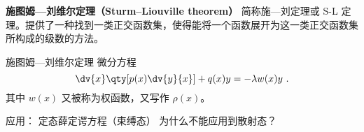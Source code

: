 
\begin{issues}
\issueDraft
\end{issues}


\textbf{施图姆—刘维尔定理（Sturm–Liouville theorem）} 简称施—刘定理或 S-L 定理。提供了一种找到一类正交函数集，使得能将一个函数展开为这一类正交函数集所构成的级数的方法。

\begin{theorem}{施图姆—刘维尔定理}
微分方程
\begin{equation}
\dv{x}\qty[p(x)\dv{y}{x}] + q(x) y = -\lambda w(x) y~.
\end{equation}
其中 $w(x)$ 又被称为权函数，又写作 $\rho(x)$。
\end{theorem}
 
应用： 定态薛定谔方程（束缚态） 为什么不能应用到散射态？
